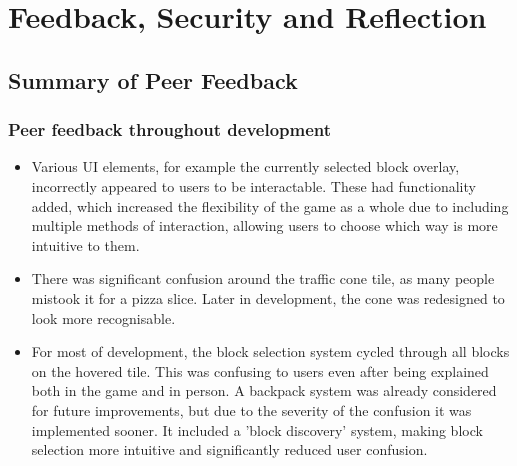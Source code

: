 \documentclass[14pt]{article}
\begin{document}
\section{Feedback, Security and Reflection}

\subsection{Summary of Peer Feedback}
\subsubsection{Peer feedback throughout development}
\begin{itemize}
  \item Various UI elements, for example the currently selected block overlay, incorrectly appeared to users to be interactable. These had functionality added, which increased the flexibility of the game as a whole due to including multiple methods of interaction, allowing users to choose which way is more intuitive to them.
  \item There was significant confusion around the traffic cone tile, as many people mistook it for a pizza slice. Later in development, the cone was redesigned to look more recognisable.
  \item For most of development, the block selection system cycled through all blocks on the hovered tile. This was confusing to users even after being explained both in the game and in person. A backpack system was already considered for future improvements, but due to the severity of the confusion it was implemented sooner. It included a 'block discovery' system, making block selection more intuitive and significantly reduced user confusion.
\end{itemize}
\end{document}
